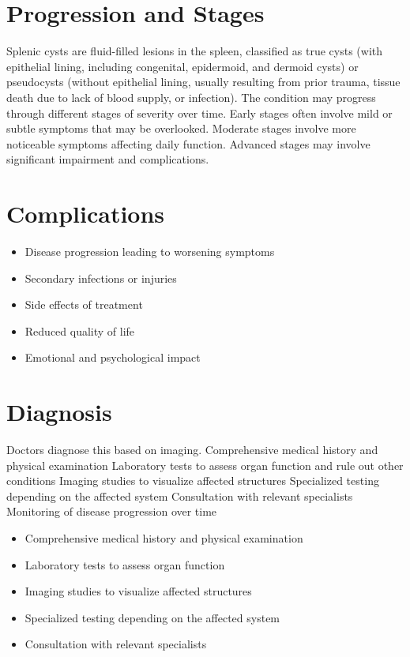 \section{Progression and Stages}
Splenic cysts are fluid-filled lesions in the spleen, classified as true cysts (with epithelial lining, including congenital, epidermoid, and dermoid cysts) or pseudocysts (without epithelial lining, usually resulting from prior trauma, tissue death due to lack of blood supply, or infection). The condition may progress through different stages of severity over time. Early stages often involve mild or subtle symptoms that may be overlooked. Moderate stages involve more noticeable symptoms affecting daily function. Advanced stages may involve significant impairment and complications.
\section{Complications}
\begin{itemize}[noitemsep]
  \item Disease progression leading to worsening symptoms
  \item Secondary infections or injuries
  \item Side effects of treatment
  \item Reduced quality of life
  \item Emotional and psychological impact
\end{itemize}
\section{Diagnosis}
Doctors diagnose this based on imaging. Comprehensive medical history and physical examination Laboratory tests to assess organ function and rule out other conditions Imaging studies to visualize affected structures Specialized testing depending on the affected system Consultation with relevant specialists Monitoring of disease progression over time

\begin{itemize}[noitemsep]
  \item Comprehensive medical history and physical examination
  \item Laboratory tests to assess organ function
  \item Imaging studies to visualize affected structures
  \item Specialized testing depending on the affected system
  \item Consultation with relevant specialists
\end{itemize}
